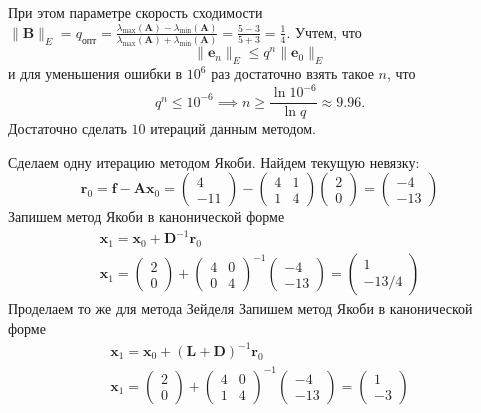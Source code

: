 \documentclass[12pt]{article}
\renewcommand{\vec}[1]{\boldsymbol{\mathbf{#1}}}
\renewcommand{\leq}{\leqslant}
\renewcommand{\geq}{\geqslant}
\begin{document}
При этом параметре скорость сходимости $\|\vec B\|_E = q_\text{опт} = \frac{\lambda_{\max}(\vec A) - \lambda_{\min}(\vec A)}{\lambda_{\max}(\vec A) + \lambda_{\min}(\vec A)} = \frac{5 - 3}{5 + 3} = \frac{1}{4}$. Учтем, что
\[
\|\vec e_n\|_E \leq q^n \|\vec e_0\|_E
\]
и для уменьшения ошибки в $10^6$ раз достаточно взять такое $n$, что
\[
q^n \leq 10^{-6} \implies n \geq \frac{\ln 10^{-6}}{\ln q} \approx 9.96.
\]
Достаточно сделать $10$ итераций данным методом.

Сделаем одну итерацию методом Якоби. Найдем текущую невязку:
\[
\vec r_0 = \vec f - \vec A \vec x_0 = 
\begin{pmatrix}
4 \\ -11
\end{pmatrix}
- \begin{pmatrix}
4 & 1\\
1 & 4
\end{pmatrix}
\begin{pmatrix}
2\\
0
\end{pmatrix} = 
\begin{pmatrix}
-4\\
-13
\end{pmatrix}
\]
Запишем метод Якоби в канонической форме
\begin{gather*}
\vec x_1 = \vec x_0 + \vec D^{-1}\vec r_0\\
\vec x_1 = \begin{pmatrix}
2\\
0
\end{pmatrix} +
\begin{pmatrix}
4 & 0\\
0 & 4
\end{pmatrix}^{-1}
\begin{pmatrix}
-4\\
-13
\end{pmatrix} = 
\begin{pmatrix}
1\\
-13/4
\end{pmatrix}
\end{gather*}
Проделаем то же для метода Зейделя
Запишем метод Якоби в канонической форме
\begin{gather*}
\vec x_1 = \vec x_0 + (\vec L + \vec D)^{-1}\vec r_0\\
\vec x_1 = \begin{pmatrix}
2\\
0
\end{pmatrix} +
\begin{pmatrix}
4 & 0\\
1 & 4
\end{pmatrix}^{-1}
\begin{pmatrix}
-4\\
-13
\end{pmatrix} = 
\begin{pmatrix}
1\\
-3
\end{pmatrix}
\end{gather*}
\end{document}

